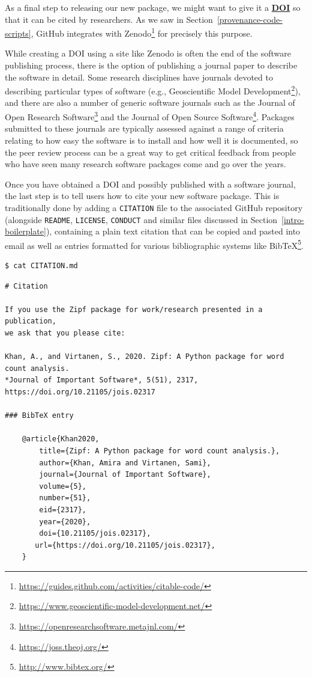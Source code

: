 \documentclass[
]{krantz}
\renewcommand{\href}[2]{#2\footnote{\url{#1}}}
\newcommand{\gref}[2]{\hyperlink{#2}{\textbf{#1}}}
\begin{document}
As a final step to releasing our new package,
we might want to give it a \gref{DOI}{doi}
so that it can be cited by researchers.
As we saw in Section~\ref{provenance-code-scripts},
GitHub \href{https://guides.github.com/activities/citable-code/}{integrates with Zenodo}
for precisely this purpose.

While creating a DOI using a site like Zenodo
is often the end of the software publishing process,
there is the option of publishing
a journal paper to describe the software in detail.
Some research disciplines have journals devoted
to describing particular types of software
(e.g., \href{https://www.geoscientific-model-development.net/}{Geoscientific Model Development}),
and there are also a number of generic software journals such as the
\href{https://openresearchsoftware.metajnl.com/}{Journal of Open Research Software} and
the \href{https://joss.theoj.org/}{Journal of Open Source Software}.
Packages submitted to these journals are typically assessed against a range of criteria
relating to how easy the software is to install
and how well it is documented,
so the peer review process can be a great way to get critical feedback
from people who have seen many research software packages come and go over the years.

Once you have obtained a DOI and possibly published with a software journal,
the last step is to tell users how to cite your new software package.
This is traditionally done by adding a \texttt{CITATION} file
to the associated GitHub repository
(alongside \texttt{README}, \texttt{LICENSE}, \texttt{CONDUCT} and similar files discussed in Section~\ref{intro-boilerplate}),
containing a plain text citation that can be copied and pasted into email
as well as entries formatted for various bibliographic systems like \href{http://www.bibtex.org/}{BibTeX}.

\begin{verbatim}
$ cat CITATION.md
\end{verbatim}

\begin{verbatim}
# Citation

If you use the Zipf package for work/research presented in a publication,
we ask that you please cite:

Khan, A., and Virtanen, S., 2020. Zipf: A Python package for word count analysis.
*Journal of Important Software*, 5(51), 2317, https://doi.org/10.21105/jois.02317

### BibTeX entry

    @article{Khan2020,
        title={Zipf: A Python package for word count analysis.},
        author={Khan, Amira and Virtanen, Sami},
        journal={Journal of Important Software},
        volume={5},
        number={51},
        eid={2317},
        year={2020},
        doi={10.21105/jois.02317},
       url={https://doi.org/10.21105/jois.02317},
    }
\end{verbatim}
\end{document}
